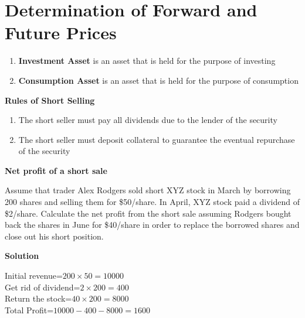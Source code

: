 \documentclass[11pt,fleqn]{book} %
\numberwithin{equation}{section} %
\numberwithin{figure}{section} %
\numberwithin{table}{section} %
\begin{document}
\chapter{Determination of Forward and Future Prices}
\begin{definition}
\begin{enumerate}
    \item \textbf{Investment Asset} is an asset that is held for the purpose of investing
    \item \textbf{Consumption Asset} is an asset that is held for the purpose of consumption
\end{enumerate}
\end{definition}
\begin{definition}\textbf{Rules of Short Selling}
\begin{enumerate}
    \item The short seller must pay all dividends due to the lender of the security
    \item The short seller must deposit collateral to guarantee the eventual repurchase of the security
\end{enumerate}
\end{definition}
\begin{exercise}\textbf{Net profit of a short sale}

Assume that trader Alex Rodgers sold short XYZ stock in March by borrowing 200
shares and selling them for \$50/share. In April, XYZ stock paid a dividend of \$2/share.
Calculate the net profit from the short sale assuming Rodgers bought back the shares
in June for \$40/share in order to replace the borrowed shares and close out his short position.

\textbf{Solution}

Initial revenue=$200\times 50=10000$\\
Get rid of dividend=$2\times 200=400$\\
Return the stock=$40\times 200=8000$\\
Total Profit=$10000-400-8000=1600$
\end{exercise}
\end{document}
